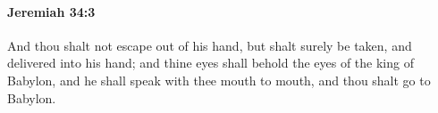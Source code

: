 
		\paragraph{Jeremiah 34:3} %
			\label{JEREMIAH-34-3}

			And thou shalt not escape out of his hand, but shalt surely be taken, and delivered into his hand; and thine eyes shall behold the eyes of the king of Babylon, and he shall speak with thee mouth to mouth, and thou shalt go to Babylon.


